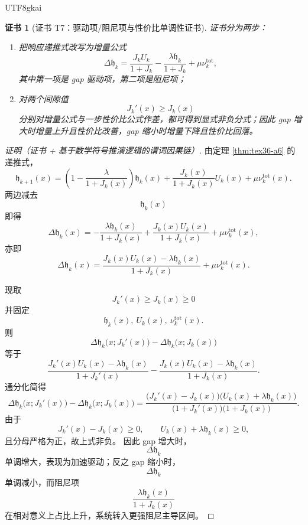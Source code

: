 \documentclass[12pt]{article}
\newtheorem{Certificate}{证书}[section]
\begin{document}
\begin{CJK*}{UTF8}{gkai}
\begin{Certificate}[证书 T7：驱动项/阻尼项与性价比单调性证书]
\label{cert:tex36-t7}
证书分为两步：
\begin{enumerate}
  \item 把响应递推式改写为增量公式
  \[
    \Delta \mathfrak h_k
    =
    \frac{J_kU_k}{1+J_k}
    -
    \frac{\lambda \mathfrak h_k}{1+J_k}
    +
    \mu \nu_k^{\mathrm{tot}},
  \]
  其中第一项是 gap 驱动项，第二项是阻尼项；
  \item 对两个间隙值
  \[
    J_k'(x)\ge J_k(x)
  \]
  分别对增量公式与一步性价比公式作差，都可得到显式非负分式；因此 gap 增大时增量上升且性价比改善，gap 缩小时增量下降且性价比回落。
\end{enumerate}
\end{Certificate}

\begin{proof}[证明（证书 + 基于数学符号推演逻辑的谓词因果链）]
由定理 \ref{thm:tex36-a6} 的递推式，
\[
  \mathfrak h_{k+1}(x)
  =
  \left(
    1-\frac{\lambda}{1+J_k(x)}
  \right)\mathfrak h_k(x)
  +
  \frac{J_k(x)}{1+J_k(x)}U_k(x)
  +
  \mu \nu_k^{\mathrm{tot}}(x).
\]
两边减去
\[
  \mathfrak h_k(x)
\]
即得
\[
  \Delta \mathfrak h_k(x)
  =
  -\frac{\lambda \mathfrak h_k(x)}{1+J_k(x)}
  +
  \frac{J_k(x)U_k(x)}{1+J_k(x)}
  +
  \mu \nu_k^{\mathrm{tot}}(x),
\]
亦即
\[
  \Delta \mathfrak h_k(x)
  =
  \frac{J_k(x)U_k(x)-\lambda \mathfrak h_k(x)}{1+J_k(x)}
  +
  \mu \nu_k^{\mathrm{tot}}(x).
\]

现取
\[
  J_k'(x)\ge J_k(x)\ge 0
\]
并固定
\[
  \mathfrak h_k(x),\ U_k(x),\ \nu_k^{\mathrm{tot}}(x).
\]
则
\[
  \Delta \mathfrak h_k\bigl(x;J_k'(x)\bigr)
  -
  \Delta \mathfrak h_k\bigl(x;J_k(x)\bigr)
\]
等于
\[
  \frac{J_k'(x)U_k(x)-\lambda \mathfrak h_k(x)}{1+J_k'(x)}
  -
  \frac{J_k(x)U_k(x)-\lambda \mathfrak h_k(x)}{1+J_k(x)}.
\]
通分化简得
\[
  \Delta \mathfrak h_k\bigl(x;J_k'(x)\bigr)
  -
  \Delta \mathfrak h_k\bigl(x;J_k(x)\bigr)
  =
  \frac{
    \bigl(J_k'(x)-J_k(x)\bigr)\bigl(U_k(x)+\lambda \mathfrak h_k(x)\bigr)
  }{
    \bigl(1+J_k'(x)\bigr)\bigl(1+J_k(x)\bigr)
  }.
\]
由于
\[
  J_k'(x)-J_k(x)\ge 0,
  \qquad
  U_k(x)+\lambda \mathfrak h_k(x)\ge 0,
\]
且分母严格为正，故上式非负。
因此 gap 增大时，
\[
  \Delta \mathfrak h_k
\]
单调增大，表现为加速驱动；反之 gap 缩小时，
\[
  \Delta \mathfrak h_k
\]
单调减小，而阻尼项
\[
  \frac{\lambda \mathfrak h_k(x)}{1+J_k(x)}
\]
在相对意义上占比上升，系统转入更强阻尼主导区间。


\end{proof}
\end{CJK*}
\end{document}
